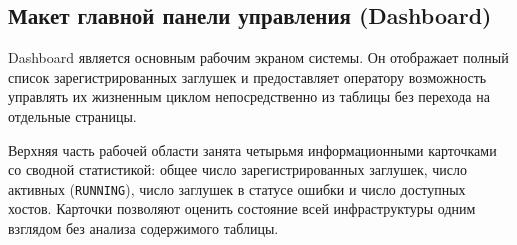 





\subsection{Макет главной панели управления (Dashboard)}

Dashboard является основным рабочим экраном системы. Он отображает полный список зарегистрированных заглушек и предоставляет оператору возможность управлять их жизненным циклом непосредственно из таблицы без перехода на отдельные страницы.

Верхняя часть рабочей области занята четырьмя информационными карточками со сводной статистикой: общее число зарегистрированных заглушек, число активных (\texttt{RUNNING}), число заглушек в статусе ошибки и число доступных хостов. Карточки позволяют оценить состояние всей инфраструктуры одним взглядом без анализа содержимого таблицы.


